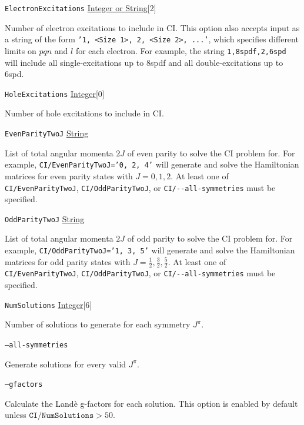 \documentclass{report}
\begin{document}
\texttt{ElectronExcitations} \uline{Integer or String}[2]
\begin{adjustwidth}{1cm}{}
Number of electron excitations to include in CI. 
This option also accepts input as a string of the form \texttt{'1, <Size 1>, 2, <Size 2>, ...'},
which specifies different limits on $pqn$ and $l$ for each electron. For example, the string
\texttt{1,8spdf,2,6spd} will include all single-excitations up to 8spdf and all double-excitations up to 
6spd.
\end{adjustwidth}

\texttt{HoleExcitations} \uline{Integer}[0]
\begin{adjustwidth}{1cm}{}
Number of hole excitations to include in CI.
\end{adjustwidth}

\texttt{EvenParityTwoJ} \uline{String}
\begin{adjustwidth}{1cm}{}
List of total angular momenta $2J$ of even parity to solve the CI problem for.
For example, \texttt{CI/EvenParityTwoJ='0, 2, 4'} will generate and solve the Hamiltonian matrices for
even parity states with $J = 0, 1, 2$. At least one of \texttt{CI/EvenParityTwoJ}, 
\texttt{CI/OddParityTwoJ}, or \texttt{CI/{-}{-}all-symmetries} must be specified.
\end{adjustwidth}

\texttt{OddParityTwoJ} \uline{String}
\begin{adjustwidth}{1cm}{}
List of total angular momenta $2J$ of odd parity to solve the CI problem for.
For example, \texttt{CI/OddParityTwoJ='1, 3, 5'} will generate and solve the Hamiltonian matrices for
odd parity states with $J = \frac{1}{2}, \frac{3}{2}, \frac{5}{2}$. At least one of \texttt{CI/EvenParityTwoJ}, 
\texttt{CI/OddParityTwoJ}, or \texttt{CI/{-}{-}all-symmetries} must be specified.
\end{adjustwidth}

\texttt{NumSolutions} \uline{Integer}[6] 
\begin{adjustwidth}{1cm}{}
Number of solutions to generate for each symmetry $J^{\pi}$.
\end{adjustwidth}

\texttt{--all-symmetries} 
\begin{adjustwidth}{1cm}{}
Generate solutions for every valid $J^{\pi}$.
\end{adjustwidth}

\texttt{--gfactors} 
\begin{adjustwidth}{1cm}{}
Calculate the Land\`{e} g-factors for each solution. This option is enabled by default unless 
$\texttt{CI/NumSolutions} > 50$.
\end{adjustwidth}
\end{document}
